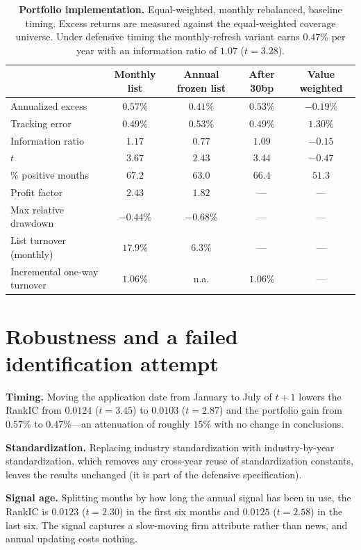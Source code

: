 \documentclass[12pt]{article}
\begin{document}
\begin{table}[t]
\centering\small
\caption{\textbf{Portfolio implementation.} Equal-weighted, monthly rebalanced,
baseline timing. Excess returns are measured against the equal-weighted
coverage universe. Under defensive timing the monthly-refresh variant earns
$0.47\%$ per year with an information ratio of $1.07$ ($t=3.28$).}
\label{tab:port}
\vspace{6pt}
\begin{tabular}{lcccc}
\toprule
& Monthly list & Annual frozen list & After 30bp & Value weighted \\
\midrule
Annualized excess & $0.57\%$ & $0.41\%$ & $0.53\%$ & $-0.19\%$ \\
Tracking error & $0.49\%$ & $0.53\%$ & $0.49\%$ & $1.30\%$ \\
Information ratio & $1.17$ & $0.77$ & $1.09$ & $-0.15$ \\
$t$ & $3.67$ & $2.43$ & $3.44$ & $-0.47$ \\
\% positive months & $67.2$ & $63.0$ & $66.4$ & $51.3$ \\
Profit factor & $2.43$ & $1.82$ & --- & --- \\
Max relative drawdown & $-0.44\%$ & $-0.68\%$ & --- & --- \\
List turnover (monthly) & $17.9\%$ & $6.3\%$ & --- & --- \\
Incremental one-way turnover & $1.06\%$ & n.a. & $1.06\%$ & --- \\
\bottomrule
\end{tabular}
\end{table}

\section{Robustness and a failed identification attempt}
\label{sec:robust}

\noindent\textbf{Timing.} Moving the application date from January to July of
$t+1$ lowers the RankIC from $0.0124$ ($t=3.45$) to $0.0103$ ($t=2.87$) and the
portfolio gain from $0.57\%$ to $0.47\%$---an attenuation of roughly $15\%$
with no change in conclusions.

\noindent\textbf{Standardization.} Replacing industry standardization with
industry-by-year standardization, which removes any cross-year reuse of
standardization constants, leaves the results unchanged (it is part of the
defensive specification).

\noindent\textbf{Signal age.} Splitting months by how long the annual signal
has been in use, the RankIC is $0.0123$ ($t=2.30$) in the first six months and
$0.0125$ ($t=2.58$) in the last six. The signal captures a slow-moving firm
attribute rather than news, and annual updating costs nothing.
\end{document}
